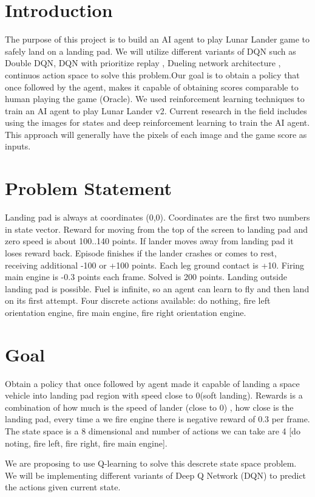 \section{Introduction}
\label{intro}
The purpose of this project is to build an AI agent to play Lunar Lander game to safely land on a landing pad. We will utilize different variants of DQN such as Double DQN\citep{DoubleQ-learning}, DQN with prioritize replay\citep{PrioritizedReplay} , Dueling network architecture \citep{Dueling}, continuos action space \citep{Continuos} to solve this problem.Our goal is to obtain a policy that once followed by the agent, makes it capable of obtaining scores comparable to human playing  the game  (Oracle).
We used reinforcement learning techniques to train an AI agent to play Lunar Lander v2. Current research in the field includes using the images for states and deep reinforcement learning to train the AI agent. This approach will generally have the pixels of each image and the game score as inputs.


\section{Problem Statement}
Landing pad is always at coordinates (0,0). Coordinates are the first two numbers in state vector. Reward for moving from the top of the screen to landing pad and zero speed is about 100..140 points. If lander moves away from landing pad it loses reward back. Episode finishes if the lander crashes or comes to rest, receiving additional -100 or +100 points. Each leg ground contact is +10. Firing main engine is -0.3 points each frame. Solved is 200 points. Landing outside landing pad is possible. Fuel is infinite, so an agent can learn to fly and then land on its first attempt. Four discrete actions available: do nothing, fire left orientation engine, fire main engine, fire right orientation engine.



\section{Goal}

Obtain a policy that once followed by agent made it capable of landing a space vehicle into landing pad region with speed close to 0(soft landing). Rewards is a combination of how much is the speed of lander (close to 0) , how close is the landing pad, every time a we fire engine there is negative reward of 0.3 per frame.  The state space is a 8 dimensional and number of actions we can take are 4 [do noting, fire left, fire right, fire main engine].

We are proposing to use Q-learning to solve this descrete state space problem. We will be implementing different variants of Deep Q Network (DQN) to predict the actions given current state.